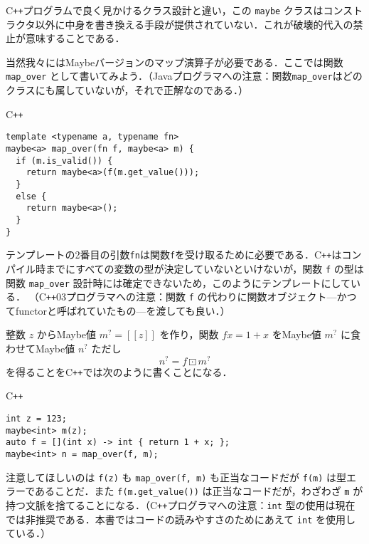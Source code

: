 \documentclass[a4paper,draft]{jsbook}
\def\[{\left[\!\left[}
\def\]{\right]\!\right]}
\newcommand{\programminglanguage}[1]{\textsf{#1}}
\newcommand{\cxx}{\programminglanguage{C}\texttt{++}}
\newcommand{\cxxzerothree}{\cxx\programminglanguage{03}}
\newcommand{\java}{\programminglanguage{Java}}
\newcommand{\code}[1]{\texttt{#1}}
\newenvironment{cxxcode}{\begin{itembox}[r]{\cxx}}{\end{itembox}}
\newcommand{\mMaybeOf}[1]{\[#1\]}
\newcommand{\mMaybeVar}[1]{{#1}^\text{?}}
\DeclareMathOperator{\mMapMaybe}{\boxdot}
\begin{document}
\cxx プログラムで良く見かけるクラス設計と違い，この \code{maybe} クラスはコンストラクタ以外に中身を書き換える手段が提供されていない．これが破壊的代入の禁止が意味することである．

当然我々にはMaybeバージョンのマップ演算子が必要である．ここでは関数 \code{map\_over} として書いてみよう．（\java プログラマへの注意：関数\code{map\_over}はどのクラスにも属していないが，それで正解なのである．）
\begin{cxxcode}
\begin{verbatim}
template <typename a, typename fn>
maybe<a> map_over(fn f, maybe<a> m) {
  if (m.is_valid()) {
    return maybe<a>(f(m.get_value()));
  }
  else {
    return maybe<a>();
  }
}
\end{verbatim}
\end{cxxcode}
テンプレートの2番目の引数\code{fn}は関数\code{f}を受け取るために必要である．\cxx はコンパイル時までにすべての変数の型が決定していないといけないが，関数 \code{f} の型は関数 \code{map\_over} 設計時には確定できないため，このようにテンプレートにしている．
（\cxxzerothree プログラマへの注意：関数 \code{f} の代わりに関数オブジェクト---かつてfunctorと呼ばれていたもの---を渡しても良い．）

整数 $z$ からMaybe値 $\mMaybeVar{m}=\mMaybeOf{z}$ を作り，関数 $fx=1+x$ をMaybe値 $\mMaybeVar{m}$ に食わせてMaybe値 $\mMaybeVar{n}$ ただし
\begin{equation}
\mMaybeVar{n}=f\mMapMaybe\mMaybeVar{m}
\end{equation}
を得ることを\cxx では次のように書くことになる．
\begin{cxxcode}
\begin{verbatim}
int z = 123;
maybe<int> m(z);
auto f = [](int x) -> int { return 1 + x; };
maybe<int> n = map_over(f, m);
\end{verbatim}
\end{cxxcode}
注意してほしいのは \code{f(z)} も \code{map\_over(f, m)} も正当なコードだが \code{f(m)} は型エラーであることだ．また \code{f(m.get\_value())} は正当なコードだが，わざわざ \code{m} が持つ文脈を捨てることになる．（\cxx プログラマへの注意：\code{int} 型の使用は現在では非推奨である．本書ではコードの読みやすさのためにあえて \code{int} を使用している．）

\end{document}

